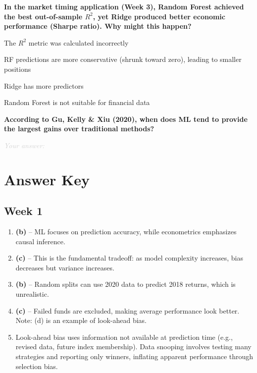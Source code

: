 \documentclass[11pt]{article}
\newcommand{\shortanswer}{%
  \vspace{0.3em}
  \textcolor{LightGray}{\textit{Your answer:} \hrulefill}
  \vspace{0.5em}
}
\begin{document}
\begin{questions}[resume]
\item \textbf{In the market timing application (Week 3), Random Forest achieved the best out-of-sample $R^2$, yet Ridge produced better economic performance (Sharpe ratio). Why might this happen?}
\begin{options}
  \item The $R^2$ metric was calculated incorrectly
  \item RF predictions are more conservative (shrunk toward zero), leading to smaller positions
  \item Ridge has more predictors
  \item Random Forest is not suitable for financial data
\end{options}

\item \textbf{According to Gu, Kelly \& Xiu (2020), when does ML tend to provide the largest gains over traditional methods?}

\shortanswer

\end{questions}

\newpage
\section*{Answer Key}

\subsection*{Week 1}

\begin{enumerate}[label=\textbf{\arabic*.}, leftmargin=*, itemsep=6pt]
  \item \textbf{(b)} -- ML focuses on prediction accuracy, while econometrics emphasizes causal inference.
  
  \item \textbf{(c)} -- This is the fundamental tradeoff: as model complexity increases, bias decreases but variance increases.
  
  \item \textbf{(b)} -- Random splits can use 2020 data to predict 2018 returns, which is unrealistic.
  
  \item \textbf{(c)} -- Failed funds are excluded, making average performance look better. Note: (d) is an example of look-ahead bias.
  
  \item Look-ahead bias uses information not available at prediction time (e.g., revised data, future index membership). Data snooping involves testing many strategies and reporting only winners, inflating apparent performance through selection bias.
\end{enumerate}
\end{document}
